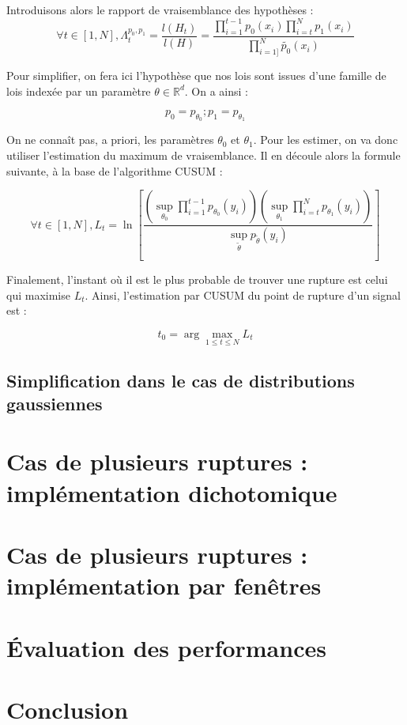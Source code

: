 \documentclass[french,12pt,notitlepage]{report}
\begin{document}
	Introduisons alors le rapport de vraisemblance des hypothèses :
	\begin{equation}
		\forall t \in [1, N], \Lambda_t^{p_0, p_1} = \frac{l(H_t)}{l(H)} = \frac{\prod_{i = 1}^{t-1} p_0(x_i) \prod_{i = t}^{N} p_1(x_i)}{\prod_{i = 1]}^{N} \tilde{p_0}(x_i)}
	\end{equation}
	
	Pour simplifier, on fera ici l'hypothèse que nos lois sont issues d'une famille de lois indexée par un paramètre $\theta \in \mathbb{R}^d$. On a ainsi :
	
	\begin{equation*}
		p_0 = p_{\theta_0} ; p_1 = p_{\theta_1}
	\end{equation*}
	
	On ne connaît pas, a priori, les paramètres $\theta_0$ et $\theta_1$. Pour les estimer, on va donc utiliser l'estimation du maximum de vraisemblance. Il en découle alors la formule suivante, à la base de l'algorithme CUSUM :
	
	\begin{equation}
		\forall t \in [1, N], L_t=\ln\left[\frac{\left(\sup_{\theta_0}\prod_{i=1}^{t-1}p_{\theta_0}(y_i)\right)\left(\sup_{\theta_1}\prod_{i=t}^Np_{\theta_1}(y_i)\right)}{\sup_{\tilde\theta}p_{\tilde\theta}(y_i)}\right]
	\end{equation}
	
	Finalement, l'instant où il est le plus probable de trouver une rupture est celui qui maximise $L_t$. Ainsi, l'estimation par CUSUM du point de rupture d'un signal est :
	
	\begin{equation}
		t_0=\arg\max_{1\le t\le N}L_t
	\end{equation}
	
	\section{Simplification dans le cas de distributions gaussiennes}
	
	
	\chapter{Cas de plusieurs ruptures : implémentation dichotomique}
	
	\chapter{Cas de plusieurs ruptures : implémentation par fenêtres}
	
	\chapter{Évaluation des performances}
	
	\chapter{Conclusion}
\end{document}
